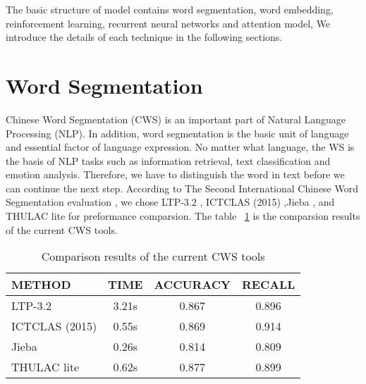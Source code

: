 The basic structure of model contains word segmentation, word embedding, reinforcement learning, recurrent neural networks and attention model, \etc We introduce the details of each technique in the following sections.

\section{Word Segmentation} \label{subsubsec:Word Segmentation}
Chinese Word Segmentation (CWS) is an important part of Natural Language Processing (NLP). In addition, word segmentation is the basic unit of language and essential factor of language expression. No matter what language, the WS is the basis of NLP tasks such as information retrieval, text classification and emotion analysis. Therefore, we have to distinguish the word in text before we can continue the next step. According to The Second International Chinese Word Segmentation evaluation \cite{The_Second_International_Chinese_Word_Segmentation_Bakeoff}, we chose LTP-3.2 \cite{LTP}, ICTCLAS (2015) \cite{ICTCLAS},Jieba \cite{Jieba}, and THULAC \cite{THULAC} lite for preformance comparsion. The table ~\ref{tab:Comparison-CWS-tools} is the comparsion results of the current CWS tools.

\begin{table}[h]
\centering
\footnotesize{
\captionsetup{width=3in}
\caption{Comparison results of the current CWS tools}
\label{tab:Comparison-CWS-tools}
\begin{tabular}{lccc}
\hline
\textbf{METHOD} & \multicolumn{1}{l}{\textbf{TIME}} & \multicolumn{1}{l}{\textbf{ACCURACY}} & \multicolumn{1}{l}{\textbf{RECALL}} \\ \hline
LTP-3.2         & 3.21s                             & 0.867                                 & 0.896                               \\ \hline
ICTCLAS (2015)  & 0.55s                             & 0.869                                 & 0.914                               \\ \hline
Jieba           & 0.26s                             & 0.814                                 & 0.809                               \\ \hline
THULAC lite     & 0.62s                             & 0.877                                 & 0.899                               \\ \hline
\end{tabular}}
\end{table}

